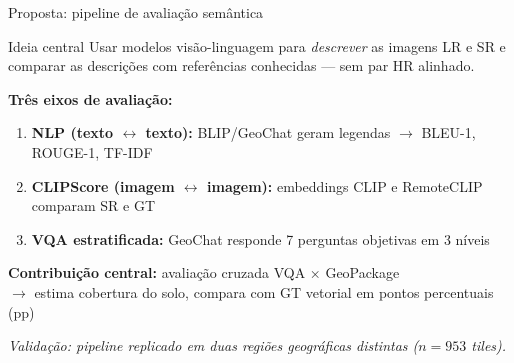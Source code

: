 \documentclass[aspectratio=169]{beamer}
\begin{document}
\begin{frame}{Proposta: pipeline de avaliação semântica}

  \begin{block}{Ideia central}
    Usar modelos visão-linguagem para \emph{descrever} as imagens LR e SR
    e comparar as descrições com referências conhecidas — sem par HR alinhado.
  \end{block}

  \vspace{0.5em}
  \textbf{Três eixos de avaliação:}

  \begin{enumerate}
    \item \textbf{NLP (texto $\leftrightarrow$ texto):} BLIP/GeoChat geram legendas $\to$ BLEU-1, ROUGE-1, TF-IDF
    \item \textbf{CLIPScore (imagem $\leftrightarrow$ imagem):} embeddings CLIP e RemoteCLIP comparam SR e GT
    \item \textbf{VQA estratificada:} GeoChat responde 7 perguntas objetivas em 3 níveis
  \end{enumerate}

  \vspace{0.5em}
  \textbf{Contribuição central:} avaliação cruzada VQA × GeoPackage\\
  $\rightarrow$ estima cobertura do solo, compara com GT vetorial em pontos percentuais (pp)

  \vspace{0.3em}
  \textit{Validação: pipeline replicado em duas regiões geográficas distintas ($n=953$ tiles).}

\end{frame}
\end{document}
